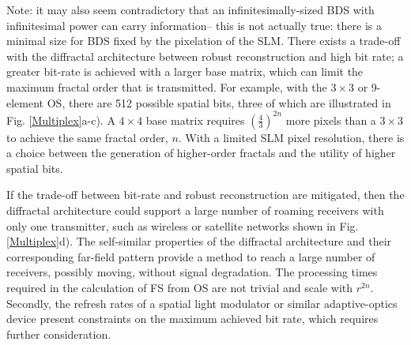 Note: it may also seem contradictory that an infinitesimally-sized BDS with infinitesimal power can carry information-- this is not actually true: there is a minimal size for BDS fixed by the pixelation of the SLM.
There exists a trade-off with the diffractal architecture between robust reconstruction and high bit rate; a greater bit-rate is achieved with a larger base matrix, which can limit the maximum fractal order that is transmitted.  For example, with the $3\times 3$ or 9-element OS, there are 512 possible spatial bits, three of which are illustrated in Fig. \ref{Multiplex}a-c).  A $4\times 4$ base matrix requires $(\frac{4}{3})^{2n}$ more pixels than a $3\times 3$ to achieve the same fractal order, $n$. With a limited SLM pixel resolution, there is a choice between the generation of higher-order fractals and the utility of higher spatial bits.   

If the trade-off between bit-rate and robust reconstruction are mitigated, then the diffractal architecture could support a large number of roaming receivers with only one transmitter, such as wireless or satellite networks shown in Fig. \ref{Multiplex}d).  The self-similar properties of the diffractal architecture and their corresponding far-field pattern provide a method to reach a large number of receivers, possibly moving, without signal degradation.  The processing times required in the calculation of FS from OS are not trivial and scale with $r^{2n}$. Secondly, the refresh rates of a spatial light modulator or similar adaptive-optics device present constraints on the maximum achieved bit rate, which requires further consideration.  

